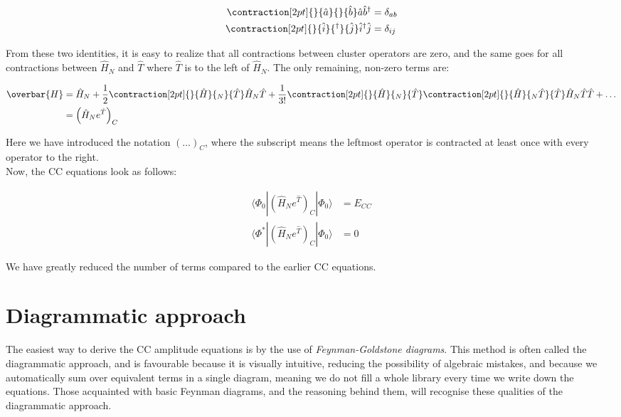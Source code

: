 	\begin{align}
		\contraction[2pt]{}{\hat{a}}{}{\hat{b}}\hat{a}\hat{b}^\dagger &= \delta_{ab}\\
		\contraction[2pt]{}{\hat{i}}{{}^\dagger}{\hat{j}}\hat{i}^\dagger\hat{j} &= \delta_{ij}
	\end{align}
	
	From these two identities, it is easy to realize that all contractions between cluster operators are zero, and the same goes for all contractions between $\hat{H}_N$ and $\hat{T}$ where $\hat{T}$ is to the left of $\hat{H}_N$. The only remaining, non-zero terms are:
	
	\begin{align}
		\begin{split}
		\overbar{H} &= \hat{H}_N + \frac{1}{2} \contraction[2pt]{}{\hat{H}}{{}_N}{\hat{T}}\hat{H}_N\hat{T} + \frac{1}{3!}\contraction[2pt]{}{\hat{H}}{{}_N}{\hat{T}}
		\contraction[2pt]{}{\hat{H}}{{}_N\hat{T}}{\hat{T}}\hat{H}_N\hat{T}\hat{T} + \ldots \\
		&= \left(\hat{H}_Ne^{\hat{T}}\right)_C
		\end{split}
	\end{align}
	
	Here we have introduced the notation $(\ldots)_C$, where the subscript means the leftmost operator is contracted at least once with every operator to the right.\\
	
	Now, the CC equations look as follows:
	
	\begin{align}
	\langle\Phi_0|\left(\hat{H}_Ne^{\hat{T}}\right)_C|\Phi_0\rangle &= E_{CC}\\
	\langle\Phi^*|\left(\hat{H}_Ne^{\hat{T}}\right)_C|\Phi_0\rangle &= 0
	\end{align}
	
	We have greatly reduced the number of terms compared to the earlier CC equations.
	
	\section{Diagrammatic approach}
	The easiest way to derive the CC amplitude equations is by the use of \emph{Feynman-Goldstone diagrams}. This method is often called the diagrammatic approach, and is favourable because it is visually intuitive, reducing the possibility of algebraic mistakes, and because we automatically sum over equivalent terms in a single diagram, meaning we do not fill a whole library every time we write down the equations. Those acquainted with basic Feynman diagrams, and the reasoning behind them, will recognise these qualities of the diagrammatic approach.
	
